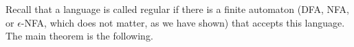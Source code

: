

\setcounter{section}{2}
\setcounter{subsection}{1}
\setcounter{dfn}{2}



Recall that a language is called regular if there is a finite automaton (DFA, NFA, or $\epsilon$-NFA, which does not matter, as we have shown)
that accepts this language.
The main theorem is the following.

